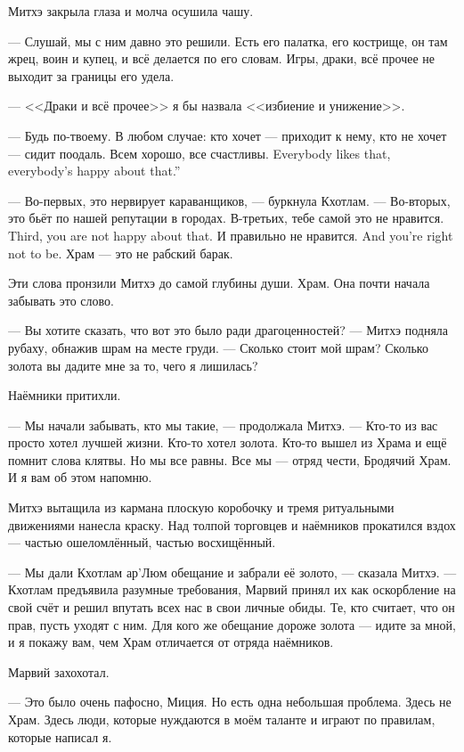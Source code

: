 Митхэ закрыла глаза и молча осушила чашу.

--- Слушай, мы с ним давно это решили.
Есть его палатка, его кострище, он там жрец, воин и купец, и всё делается по его словам.
Игры, драки, всё прочее не выходит за границы его удела.

--- <<Драки и всё прочее>> я бы назвала <<избиение и унижение>>.

--- Будь по-твоему.
В любом случае: кто хочет --- приходит к нему, кто не хочет --- сидит поодаль.
{Всем хорошо, все счастливы.}
{Everybody likes that, everybody's happy about that.''}

--- Во-первых, это нервирует караванщиков, --- буркнула Кхотлам.
--- Во-вторых, это бьёт по нашей репутации в городах.
{В-третьих, тебе самой это не нравится.}
{Third, you are not happy about that.}
{И правильно не нравится.}
{And you're right not to be.}
Храм --- это не рабский барак.

Эти слова пронзили Митхэ до самой глубины души.
Храм.
Она почти начала забывать это слово.

\asterism

--- Вы хотите сказать, что вот это было ради драгоценностей? --- Митхэ подняла рубаху, обнажив шрам на месте груди.
--- Сколько стоит мой шрам?
Сколько золота вы дадите мне за то, чего я лишилась?

Наёмники притихли.

--- Мы начали забывать, кто мы такие, --- продолжала Митхэ.
--- Кто-то из вас просто хотел лучшей жизни.
Кто-то хотел золота.
Кто-то вышел из Храма и ещё помнит слова клятвы.
Но мы все равны.
Все мы --- отряд чести, Бродячий Храм.
И я вам об этом напомню.

Митхэ вытащила из кармана плоскую коробочку и тремя ритуальными движениями нанесла краску.
Над толпой торговцев и наёмников прокатился вздох --- частью ошеломлённый, частью восхищённый.

--- Мы дали Кхотлам ар'Люм обещание и забрали её золото, --- сказала Митхэ.
--- Кхотлам предъявила разумные требования, Марвий принял их как оскорбление на свой счёт и решил впутать всех нас в свои личные обиды.
Те, кто считает, что он прав, пусть уходят с ним.
Для кого же обещание дороже золота --- идите за мной, и я покажу вам, чем Храм отличается от отряда наёмников.

Марвий захохотал.

--- Это было очень пафосно, Миция.
Но есть одна небольшая проблема.
Здесь не Храм.
Здесь люди, которые нуждаются в моём таланте и играют по правилам, которые написал я.

